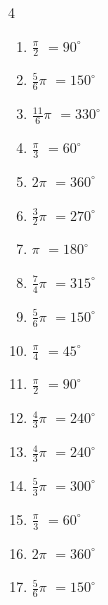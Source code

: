 \begin{multicols}{4}
\begin{enumerate}
  \item $\displaystyle \frac{\pi}{2}$
        $\displaystyle =90^{\circ}$

  \item $\displaystyle \frac{5}{6}\pi$
        $\displaystyle =150^{\circ}$

  \item $\displaystyle \frac{11}{6}\pi$
        $\displaystyle =330^{\circ}$

  \item $\displaystyle \frac{\pi}{3}$
        $\displaystyle =60^{\circ}$

  \item $\displaystyle 2\pi$
        $\displaystyle =360^{\circ}$

  \item $\displaystyle \frac{3}{2}\pi$
        $\displaystyle =270^{\circ}$

  \item $\displaystyle \pi$
        $\displaystyle =180^{\circ}$

  \item $\displaystyle \frac{7}{4}\pi$
        $\displaystyle =315^{\circ}$

  \item $\displaystyle \frac{5}{6}\pi$
        $\displaystyle =150^{\circ}$

  \item $\displaystyle \frac{\pi}{4}$
        $\displaystyle =45^{\circ}$

  \item $\displaystyle \frac{\pi}{2}$
        $\displaystyle =90^{\circ}$

  \item $\displaystyle \frac{4}{3}\pi$
        $\displaystyle =240^{\circ}$

  \item $\displaystyle \frac{4}{3}\pi$
        $\displaystyle =240^{\circ}$

  \item $\displaystyle \frac{5}{3}\pi$
        $\displaystyle =300^{\circ}$

  \item $\displaystyle \frac{\pi}{3}$
        $\displaystyle =60^{\circ}$

  \item $\displaystyle 2\pi$
        $\displaystyle =360^{\circ}$

  \item $\displaystyle \frac{5}{6}\pi$
        $\displaystyle =150^{\circ}$


\end{enumerate}
\end{multicols}

